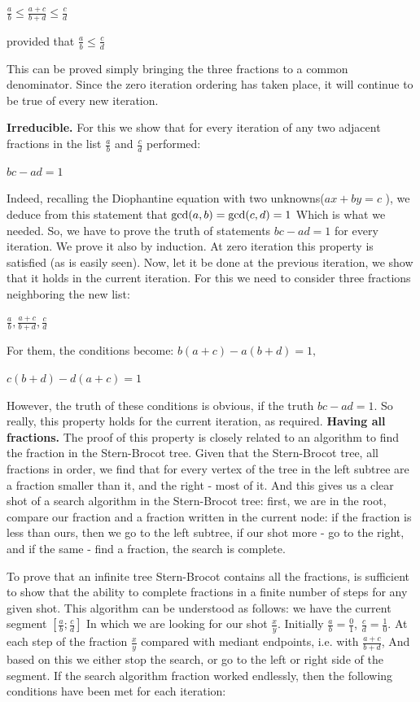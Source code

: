 $\frac {a} {b} \le \frac {a + c} {b + d} \le \frac {c} {d}$

provided that
$\frac {a} {b} \le \frac {c} {d}$

This can be proved simply bringing the three fractions to a common denominator.
Since the zero iteration ordering has taken place, it will continue to be true of every new iteration.

\textbf{Irreducible.} For this we show that for every iteration of any two adjacent fractions in the list $\frac {a} {b}$ and $\frac {c} {d}$ performed:

$bc-ad = 1$

Indeed, recalling the Diophantine equation with two unknowns($ax + by = c$ ), we deduce from this statement that ${\rm gcd} (a, b) = {\rm gcd} (c, d) = 1$ Which is what we needed.
So, we have to prove the truth of statements $bc-ad = 1$ for every iteration. We prove it also by induction. At zero iteration this property is satisfied (as is easily seen). Now, let it be done at the previous iteration, we show that it holds in the current iteration. For this we need to consider three fractions neighboring the new list:

$\frac {a} {b}, \frac {a + c} {b + d}, \frac {c} {d}$

For them, the conditions become:
$b (a + c) - a (b + d) = 1,$

$c (b + d) - d (a + c) = 1$

However, the truth of these conditions is obvious, if the truth $bc-ad = 1$. So really, this property holds for the current iteration, as required.
\textbf{Having all fractions.} The proof of this property is closely related to an algorithm to find the fraction in the Stern-Brocot tree. Given that the Stern-Brocot tree, all fractions in order, we find that for every vertex of the tree in the left subtree are a fraction smaller than it, and the right - most of it. And this gives us a clear shot of a search algorithm in the Stern-Brocot tree: first, we are in the root, compare our fraction and a fraction written in the current node: if the fraction is less than ours, then we go to the left subtree, if our shot more - go to the right, and if the same - find a fraction, the search is complete.

To prove that an infinite tree Stern-Brocot contains all the fractions, is sufficient to show that the ability to complete fractions in a finite number of steps for any given shot. This algorithm can be understood as follows: we have the current segment $\left [\frac {a} {b}; \frac {c} {d} \right]$ In which we are looking for our shot $\frac {x} {y}$. Initially $\frac {a} {b} = \frac {0} {1}$, $\frac {c} {d} = \frac {1} {0}$. At each step of the fraction $\frac {x} {y}$ compared with mediant endpoints, i.e. with $\frac {a + c} {b + d}$, And based on this we either stop the search, or go to the left or right side of the segment. If the search algorithm fraction worked endlessly, then the following conditions have been met for each iteration:

